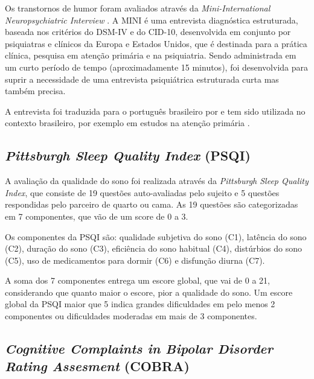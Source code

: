 \documentclass[chapter=TITLE,
               oneside,
               12pt,
               a4paper,
               english,
               brazil]{abntex2}    %
\begin{document}
            Os transtornos de humor foram avaliados através da
            \textit{Mini-International Neuropsychiatric Interview}
            \parencite{sheehan_mini-international_1998}.
            A MINI é uma entrevista diagnóstica estruturada,
            baseada nos critérios do DSM-IV e do CID-10,
            desenvolvida em conjunto por psiquiatras e clínicos
            da Europa e Estados Unidos,
            que é destinada para a prática clínica, pesquisa em atenção primária
            e na psiquiatria.
            Sendo administrada em um curto período de tempo (aproximadamente 15 minutos),
            foi desenvolvida para suprir a necessidade de uma entrevista psiquiátrica
            estruturada curta mas também precisa.
    
            A entrevista foi traduzida para o português brasileiro por
            \textcite{amorim_mini_2000} e tem sido utilizada no contexto
            brasileiro, por exemplo em estudos na atenção primária
            \parencite{de_azevedo_marques_validity_2008}.
    
        \subsection{\textit{Pittsburgh Sleep Quality Index} (PSQI)}
        \label{sec:psqi}
    
            A avaliação da qualidade do sono foi realizada através da
            \textit{Pittsburgh Sleep Quality Index}, que consiste de 19 questões
            auto-avaliadas pelo sujeito e 5 questões respondidas pelo parceiro de
            quarto ou cama. 
            As 19 questões são categorizadas em 7 componentes, que vão de um score
            de 0 a 3.
            \parencite{bertolazi_validation_2011}
    
            Os componentes da PSQI são: qualidade subjetiva do sono (C1),
            latência do sono (C2), duração do sono (C3),
            eficiência do sono habitual (C4), distúrbios do sono (C5),
            uso de medicamentos para dormir (C6) e disfunção diurna (C7).
    
            A soma dos 7 componentes entrega um escore global, que vai de 0 a 21,
            considerando que quanto maior o escore, pior a qualidade do sono.
            Um escore global da PSQI maior que 5 indica grandes dificuldades
            em pelo menos 2 componentes ou dificuldades moderadas
            em mais de 3 componentes.
    
    
        \subsection{\textit{Cognitive Complaints in Bipolar Disorder Rating Assesment} 
        (COBRA)}
        \label{sec:cobra}
    
\end{document}
